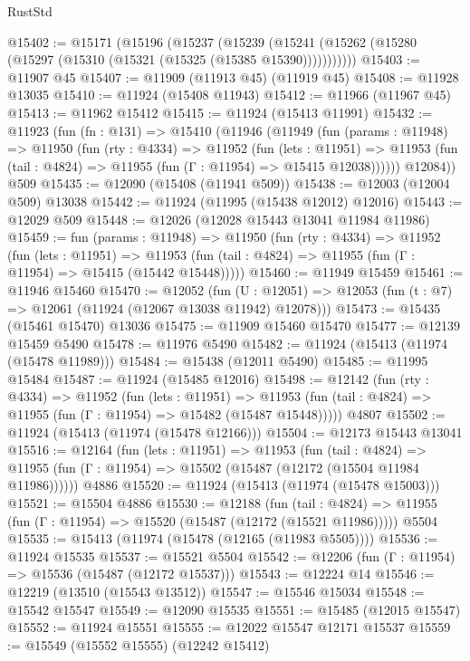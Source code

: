 \begin{lexlean}{RustStd}
\begin{coremodule}
@15402 := @15171
    (@15196
      (@15237
        (@15239 (@15241 (@15262 (@15280 (@15297 (@15310 (@15321 (@15325 (@15385 @15390)))))))))))
@15403 := @11907 @45
@15407 := @11909 (@11913 @45) (@11919 @45)
@15408 := @11928 @13035
@15410 := @11924 (@15408 @11943)
@15412 := @11966 (@11967 @45)
@15413 := @11962 @15412
@15415 := @11924 (@15413 @11991)
@15432 := @11923
    (fun (fn : @131) =>
    @15410
      (@11946
        (@11949
          (fun (params : @11948) =>
          @11950
            (fun (rty : @4334) =>
            @11952
              (fun (lets : @11951) =>
              @11953 (fun (tail : @4824) => @11955 (fun (Γ : @11954) => @15415 @12038))))))
        @12084))
    @509
@15435 := @12090 (@15408 (@11941 @509))
@15438 := @12003 (@12004 @509) @13038
@15442 := @11924 (@11995 (@15438 @12012) @12016)
@15443 := @12029 @509
@15448 := @12026 (@12028 @15443 @13041 @11984 @11986)
@15459 := fun (params : @11948) =>
  @11950
    (fun (rty : @4334) =>
    @11952
      (fun (lets : @11951) =>
      @11953 (fun (tail : @4824) => @11955 (fun (Γ : @11954) => @15415 (@15442 @15448)))))
@15460 := @11949 @15459
@15461 := @11946 @15460
@15470 := @12052
    (fun (U : @12051) => @12053 (fun (t : @7) => @12061 (@11924 (@12067 @13038 @11942) @12078)))
@15473 := @15435 (@15461 @15470) @13036
@15475 := @11909 @15460 @15470
@15477 := @12139 @15459 @5490
@15478 := @11976 @5490
@15482 := @11924 (@15413 (@11974 (@15478 @11989)))
@15484 := @15438 (@12011 @5490)
@15485 := @11995 @15484
@15487 := @11924 (@15485 @12016)
@15498 := @12142
    (fun (rty : @4334) =>
    @11952
      (fun (lets : @11951) =>
      @11953 (fun (tail : @4824) => @11955 (fun (Γ : @11954) => @15482 (@15487 @15448)))))
    @4807
@15502 := @11924 (@15413 (@11974 (@15478 @12166)))
@15504 := @12173 @15443 @13041
@15516 := @12164
    (fun (lets : @11951) =>
    @11953
      (fun (tail : @4824) =>
      @11955 (fun (Γ : @11954) => @15502 (@15487 (@12172 (@15504 @11984 @11986))))))
    @4886
@15520 := @11924 (@15413 (@11974 (@15478 @15003)))
@15521 := @15504 @4886
@15530 := @12188
    (fun (tail : @4824) => @11955 (fun (Γ : @11954) => @15520 (@15487 (@12172 (@15521 @11986)))))
    @5504
@15535 := @15413 (@11974 (@15478 (@12165 (@11983 @5505))))
@15536 := @11924 @15535
@15537 := @15521 @5504
@15542 := @12206 (fun (Γ : @11954) => @15536 (@15487 (@12172 @15537)))
@15543 := @12224 @14
@15546 := @12219 (@13510 (@15543 @13512))
@15547 := @15546 @15034
@15548 := @15542 @15547
@15549 := @12090 @15535
@15551 := @15485 (@12015 @15547)
@15552 := @11924 @15551
@15555 := @12022 @15547 @12171 @15537
@15559 := @15549 (@15552 @15555) (@12242 @15412)

\end{coremodule}
\end{lexlean}
